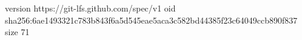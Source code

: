 version https://git-lfs.github.com/spec/v1
oid sha256:6ae1493321c783b843f6a5d545eae5aca3c582bd44385f23c64049ccb890f837
size 71
